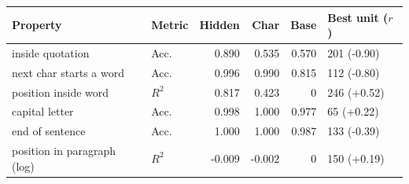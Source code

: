 \footnotesize
\begin{tabular}{llrrrl}
\toprule
Property & Metric & Hidden & Char & Base & Best unit ($r$) \\
\midrule
inside quotation & Acc. & 0.890 & 0.535 & 0.570 & 201 (-0.90) \\
next char starts a word & Acc. & 0.996 & 0.990 & 0.815 & 112 (-0.80) \\
position inside word & $R^2$ & 0.817 & 0.423 & 0 & 246 (+0.52) \\
capital letter & Acc. & 0.998 & 1.000 & 0.977 & 65 (+0.22) \\
end of sentence & Acc. & 1.000 & 1.000 & 0.987 & 133 (-0.39) \\
position in paragraph (log) & $R^2$ & -0.009 & -0.002 & 0 & 150 (+0.19) \\
\bottomrule
\end{tabular}
